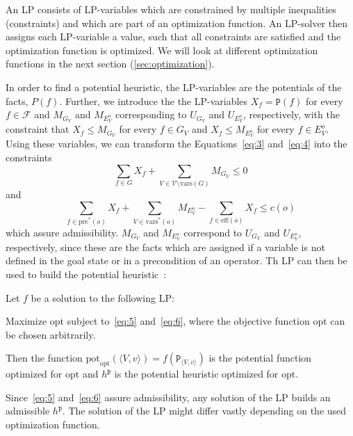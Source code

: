 An LP consists of LP-variables which are constrained by multiple inequalities (constraints) and which are part of an optimization function.
An LP-solver then assigns each LP-variable a value, such that all constraints are satisfied and the optimization function is optimized.
We will look at different optimization functions in the next section (\ref{sec:optimization}).

In order to find a potential heuristic, the LP-variables are the potentials of the facts, $P(f)$.
Further, we introduce the the LP-variables $X_f=\mathtt{P}(f)$ for every $f\in\mathcal{F}$ and $M_{G_V}$ and $M_{E^o_V}$ corresponding to $U_{G_V}$ and $U_{E_V^o}$, respectively, with the constraint that $X_f\leq M_{G_V}$ for every $f\in G_V$ and $X_f\leq M_{E^o_V}$ for every $f\in E^o_V$.
Using these variables, we can transform the Equations~\eqref{eq:3} and~\eqref{eq:4} into the constraints
\begin{equation}\sum_{f\in G}X_f+\sum_{V\in\mathcal{V}\setminus\text{vars}(G)}M_{G_V}\leq0\label{eq:5}\end{equation}
and
\begin{equation}\sum_{f\in\text{pre}^*(o)}X_f+\sum_{V\in\text{vars}^*(o)}M_{E^o_V}-\sum_{f\in\text{eff}(o)}X_f\leq c(o)\label{eq:6}\end{equation}
which assure admissibility.
$M_{G_V}$ and $M_{E^o_V}$ correspond to $U_{G_V}$ and $U_{E_V^o}$, respectively, since these are the facts which are assigned if a variable is not defined in the goal state or in a precondition of an operator.
Th LP can then be used to build the potential heuristic~\citep{pommerening2015non}:

\begin{definition}
    \label{definition:LP}
    Let $f$ be a solution to the following LP:

    Maximize $\mathrm{opt}$ subject to~\eqref{eq:5} and~\eqref{eq:6}, where the objective function $\mathrm{opt}$ can be chosen arbitrarily.

    Then the function $\mathrm{pot}_{\mathrm{opt}}(\langle V,v\rangle)=f(\mathtt{P}_{\langle V,v\rangle})$ is the {\normalfont potential function optimized for $\mathrm{opt}$} and $h^{\mathtt{p}}$ is the {\normalfont potential heuristic optimized for $\mathrm{opt}$}.
\end{definition}

Since~\ref{eq:5} and~\ref{eq:6} assure admissibility, any solution of the LP builds an admissible $h^\mathtt{p}$.
The solution of the LP might differ vastly depending on the used optimization function.

